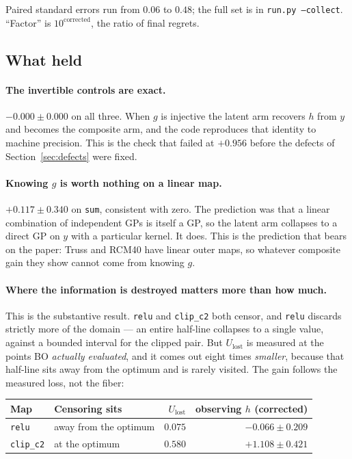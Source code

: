 \documentclass[11pt]{article}
\newcommand{\Ulost}{U_{\text{lost}}}
\begin{document}
\noindent Paired standard errors run from $0.06$ to $0.48$; the full set is in
\texttt{run.py --collect}. ``Factor'' is $10^{\text{corrected}}$, the ratio of
final regrets.

\subsection{What held}

\paragraph{The invertible controls are exact.} $-0.000\pm0.000$ on all three.
When $g$ is injective the latent arm recovers $h$ from $y$ and becomes the
composite arm, and the code reproduces that identity to machine precision. This
is the check that failed at $+0.956$ before the defects of
Section~\ref{sec:defects} were fixed.

\paragraph{Knowing $g$ is worth nothing on a linear map.} $+0.117\pm0.340$ on
\texttt{sum}, consistent with zero. The prediction was that a linear combination
of independent GPs is itself a GP, so the latent arm collapses to a direct GP on
$y$ with a particular kernel. It does. This is the prediction that bears on the
paper: Truss and RCM40 have linear outer maps, so whatever composite gain they
show cannot come from knowing $g$.

\paragraph{Where the information is destroyed matters more than how much.} This
is the substantive result. \texttt{relu} and \texttt{clip\_c2} both censor, and
\texttt{relu} discards strictly more of the domain --- an entire half-line collapses
to a single value, against a bounded interval for the clipped pair. But $\Ulost$
is measured at the points BO \emph{actually evaluated}, and it comes out eight times
\emph{smaller}, because that half-line sits away from the optimum and is rarely
visited. The gain follows the measured loss, not the fiber:

\begin{center}
\begin{tabular}{llrr}
\toprule
Map & Censoring sits & $\Ulost$ & observing $h$ (corrected) \\
\midrule
\texttt{relu}     & away from the optimum & $0.075$ & $-0.066\pm0.209$ \\
\texttt{clip\_c2} & at the optimum        & $0.580$ & $+1.108\pm0.421$ \\
\bottomrule
\end{tabular}
\end{center}
\end{document}
